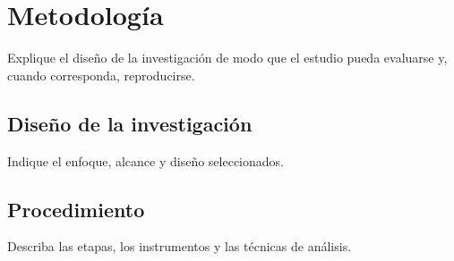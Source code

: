\chapter{Metodología}
\label{cap:metodologia}

Explique el diseño de la investigación de modo que el estudio pueda evaluarse
y, cuando corresponda, reproducirse.

\section{Diseño de la investigación}

Indique el enfoque, alcance y diseño seleccionados.

\section{Procedimiento}

Describa las etapas, los instrumentos y las técnicas de análisis.
